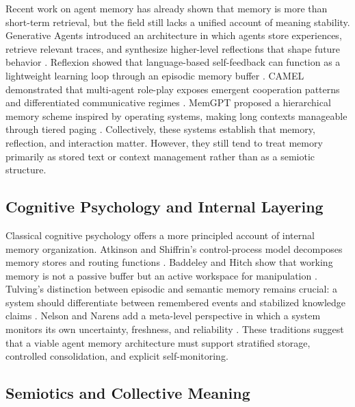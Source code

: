 \documentclass[11pt]{article}
\begin{document}
Recent work on agent memory has already shown that memory is more than short-term retrieval, but the field still lacks a unified account of meaning stability. Generative Agents introduced an architecture in which agents store experiences, retrieve relevant traces, and synthesize higher-level reflections that shape future behavior \cite{park2023generative}. Reflexion showed that language-based self-feedback can function as a lightweight learning loop through an episodic memory buffer \cite{shinn2023reflexion}. CAMEL demonstrated that multi-agent role-play exposes emergent cooperation patterns and differentiated communicative regimes \cite{li2023camel}. MemGPT proposed a hierarchical memory scheme inspired by operating systems, making long contexts manageable through tiered paging \cite{packer2024memgpt}. Collectively, these systems establish that memory, reflection, and interaction matter. However, they still tend to treat memory primarily as stored text or context management rather than as a semiotic structure.

\subsection{Cognitive Psychology and Internal Layering}

Classical cognitive psychology offers a more principled account of internal memory organization. Atkinson and Shiffrin's control-process model decomposes memory stores and routing functions \cite{atkinson1968human}. Baddeley and Hitch show that working memory is not a passive buffer but an active workspace for manipulation \cite{baddeley1974working}. Tulving's distinction between episodic and semantic memory remains crucial: a system should differentiate between remembered events and stabilized knowledge claims \cite{tulving1972episodic}. Nelson and Narens add a meta-level perspective in which a system monitors its own uncertainty, freshness, and reliability \cite{nelson1990metamemory}. These traditions suggest that a viable agent memory architecture must support stratified storage, controlled consolidation, and explicit self-monitoring.

\subsection{Semiotics and Collective Meaning}
\end{document}
